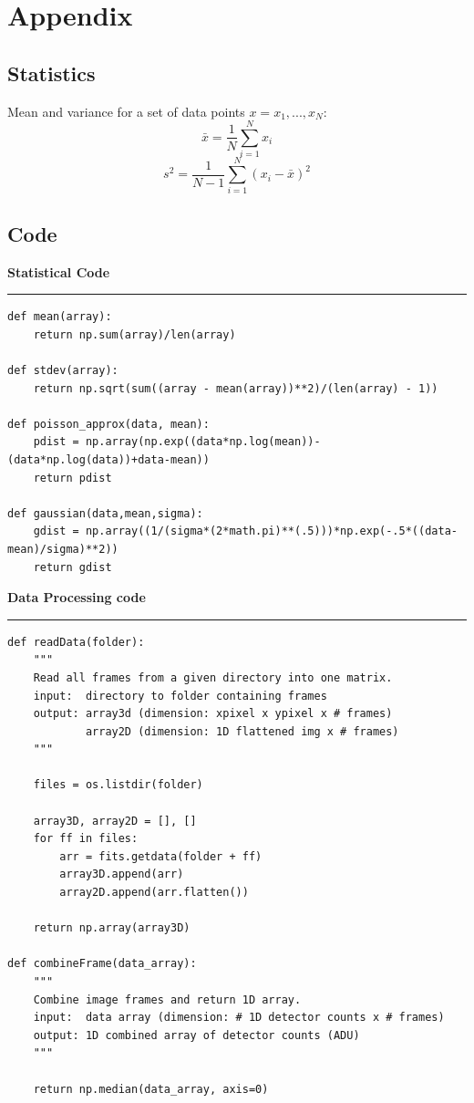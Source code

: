 \documentclass[preprint]{aastex62}
\begin{document}
\section{Appendix}

\subsection{Statistics}
Mean and variance for a set of data points $x={x_1, ...,x_N}$:
\begin{equation}
	\bar{x} = \frac{1}{N} \sum^N_{i=1} x_i  
\end{equation}
\begin{equation}
	s^2 = \frac{1}{N-1} \sum^N_{i=1} (x_i - \bar{x})^2
\end{equation}

\subsection{Code}

\small
\textbf{Statistical Code} \label{code:stats} \\
\hrule
\begin{lstlisting}
def mean(array):
    return np.sum(array)/len(array)

def stdev(array):
    return np.sqrt(sum((array - mean(array))**2)/(len(array) - 1))

def poisson_approx(data, mean):
    pdist = np.array(np.exp((data*np.log(mean))-(data*np.log(data))+data-mean))
    return pdist

def gaussian(data,mean,sigma):
    gdist = np.array((1/(sigma*(2*math.pi)**(.5)))*np.exp(-.5*((data-mean)/sigma)**2)) 
    return gdist
\end{lstlisting}

\textbf{Data Processing code} \label{code:data} \\
\hrule
\begin{lstlisting}
def readData(folder):
    """
    Read all frames from a given directory into one matrix.
    input:  directory to folder containing frames
    output: array3d (dimension: xpixel x ypixel x # frames)
            array2D (dimension: 1D flattened img x # frames)
    """
    
    files = os.listdir(folder)

    array3D, array2D = [], []
    for ff in files:
        arr = fits.getdata(folder + ff)
        array3D.append(arr)
        array2D.append(arr.flatten())
    
    return np.array(array3D)

def combineFrame(data_array):
    """
    Combine image frames and return 1D array.
    input:  data array (dimension: # 1D detector counts x # frames)
    output: 1D combined array of detector counts (ADU)
    """
    
    return np.median(data_array, axis=0)
\end{lstlisting}
\end{document}
